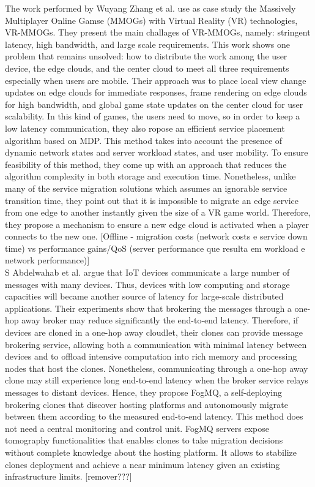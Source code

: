 \noindent\tab The work performed by Wuyang Zhang et al. \cite{Zhang2017} use as case study the Massively Multiplayer Online Gamse (MMOGs) with Virtual Reality (VR) technologies, VR-MMOGs. They present the main challages of VR-MMOGs, namely: stringent latency, high bandwidth, and large scale requirements. This work shows one problem that remains unsolved: how to distribute the work among the user device, the edge clouds, and the center cloud to meet all three requirements especially when users are mobile. Their approach was to place local view change updates on edge clouds for immediate responses, frame rendering on edge clouds for high bandwidth, and global game state updates on the center cloud for user scalability. In this kind of games, the users need to move, so in order to keep a low latency communication, they also ropose an efficient service placement algorithm based on MDP. This method takes into account the presence of dynamic network states and server workload states, and user mobility. To ensure feasibility of this method, they come up with an approach that reduces the algorithm complexity in both storage and execution time. Nonetheless, unlike many of the service migration solutions which assumes an ignorable service transition time, they point out that it is impossible to migrate an edge service from one edge to another instantly given the size of a VR game world. Therefore, they propose a mechanism to ensure a new edge cloud is activated when a player connects to the new one. [Offline - migration costs (network costs e service down time) vs performance gains/QoS (server performance que resulta em workload e network performance)]\\
\noindent\tab S Abdelwahab et al. \cite{abdelwahab2018clones} argue that IoT devices communicate a large number of messages with many devices. Thus, devices with low computing and storage capacities will became another source of latency for large-scale distributed applications. Their experiments show that brokering the messages through a one-hop away broker may reduce significantly the end-to-end latency. Therefore, if devices are cloned in a one-hop away cloudlet, their clones can provide message brokering service, allowing both a communication with minimal latency between devices and to offload intensive computation into rich memory and processing nodes that host the clones. Nonetheless, communicating through a one-hop away clone may still experience long end-to-end latency when the broker service relays messages to distant devices. Hence, they propose FogMQ, a self-deploying brokering clones that discover hosting platforms and autonomously migrate between them according to the measured end-to-end latency. This method does not need a central monitoring and control unit. FogMQ servers expose tomography functionalities that enables clones to take migration decisions without complete knowledge about the hosting platform. It allows to stabilize clones deployment and achieve a near minimum latency given an existing infrastructure limits. [remover???]\\
